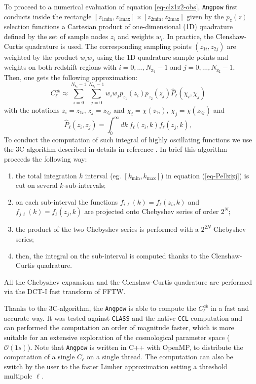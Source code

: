 \documentclass[\docopts]{\docclass}
\newcommand{\mrm}[1]{\mathrm{#1}}
\newcommand{\ccl}{{\tt CCL}\xspace}
\begin{document}
To proceed to a numerical evaluation of equation \ref{eq-clz1z2-obs}, \texttt{Angpow} first conducts  inside the rectangle $ [z_{1\mrm{min}},z_{1\mrm{max}}] \times [z_{2\mrm{min}},z_{2\mrm{max}}]$ given by the $p_z(z)$ selection functions a Cartesian product of one-dimensional (1D) quadrature
 defined by the set of sample nodes $z_i$ and weights $w_i$. In practice, the Clenshaw-Curtis quadrature is used.   The corresponding sampling points $(z_{1i},z_{2j})$ are weighted by the product  $w_i w_j$ using the 1D quadrature sample points and weights on both redshift regions with $i=0,\dots, N_{\mrm{z}_1}-1$ and $j=0,\dots,N_{\mrm{z}_2}-1$. Then, one gets the following approximation:
\begin{equation}
C_{\ell}^{ab} \approx  \sum_{i=0}^{N_{\mrm{z}_1}-1}\sum_{j=0}^{N_{\mrm{z}_2}-1} w_i w_j p_{z_1}(z_i)p_{z_2}(z_j) \widehat{P}_\ell(\chi_i,\chi_j)
\label{eq-cross-zquadra}
\end{equation}
with the notations $z_i = z_{1i}$, $z_j = z_{2j}$ and  $\chi_i = \chi(z_{1i})$, $\chi_j = \chi(z_{2j})$ and
\begin{equation}
\widehat{P}_\ell(z_i,z_j) =   \int_0^\infty dk\ f_\ell(z_i,k) f_\ell(z_j,k)
\label{eq-Pellzizj}
,\end{equation}
To conduct the computation of such integral of highly oscillating functions we use the 3C-algorithm described in details in reference \citep{2017arXiv170103592C}. In brief this algorithm proceeds the following way:
\begin{enumerate}
\item the total integration $k$ interval (eg. $[k_\mathrm{min}, k_\mathrm{max}]$) in equation (\ref{eq-Pellzizj}) is cut on several $k$-sub-intervals;
\item  on each sub-interval the functions $f_{i\, \ell}(k) = f_\ell(z_i,k) $ and $f_{j\, \ell}(k) = f_\ell(z_j,k)$ are projected onto Chebyshev series of order $2^N$;
\item the product of the two Chebyshev series is performed with a $2^{2N}$ Chebyshev series;
\item then, the integral on the sub-interval is computed thanks to the Clenshaw-Curtis quadrature.
\end{enumerate}
All the Chebyshev expansions and the Clenshaw-Curtis quadrature are performed via the DCT-I fast transform of FFTW.

Thanks to the 3C-algorithm, the \texttt{Angpow} is able to compute the $C_{\ell}^{ab}$ in a fast and accurate way. It was tested against \texttt{CLASS} and the native \ccl computation and can performed the computation an order of magnitude faster, which is more suitable for an extensive exploration of the cosmological parameter space ($\mathcal{O}(1s)$). Note that \texttt{Angpow} is written in C++ with OpenMP, to distribute the computation of a single $C_\ell$ on a single thread. The computation can also be switch by the user to the faster Limber approximation setting a threshold multipole $\ell$.
\end{document}
